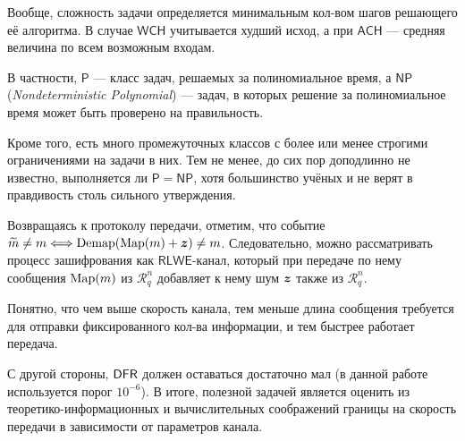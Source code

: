 Вообще, сложность задачи определяется минимальным кол-вом шагов решающего её алгоритма. В случае $\mathsf{WCH}$ учитывается худший исход, а при $\mathsf{ACH}$ --- средняя величина по всем возможным входам.

В частности, $\mathsf{P}$ --- класс задач, решаемых за полиномиальное время, а $\mathsf{NP}$ ({\it Nondeterministic Polynomial}) --- задач, в которых решение за полиномиальное время может быть проверено на правильность.

Кроме того, есть много промежуточных классов с более или менее строгими ограничениями на задачи в них. Тем не менее, до сих пор доподлинно не известно, выполняется ли $\mathsf{P} = \mathsf{NP}$, хотя большинство учёных и не верят в правдивость столь сильного утверждения.

Возвращаясь к протоколу передачи, отметим, что событие $\widetilde m \neq m \eqv \Demap(\Map(m)+\bold z) \neq m$. Следовательно, можно рассматривать процесс зашифрования как $\mathsf{RLWE}$-канал, который при передаче по нему сообщения $\Map(m)$ из $\mathcal{R}_q^n$ добавляет к нему шум $\bold z$ также из $\mathcal{R}_q^n$.

Понятно, что чем выше скорость канала, тем меньше длина сообщения требуется для отправки фиксированного кол-ва информации, и тем быстрее работает передача.

С другой стороны, $\DFR$ должен оставаться достаточно мал (в данной работе используется порог $10^{-6}$). В итоге, полезной задачей является оценить из теоретико-информационных и вычислительных соображений границы на скорость передачи в зависимости от параметров канала.
